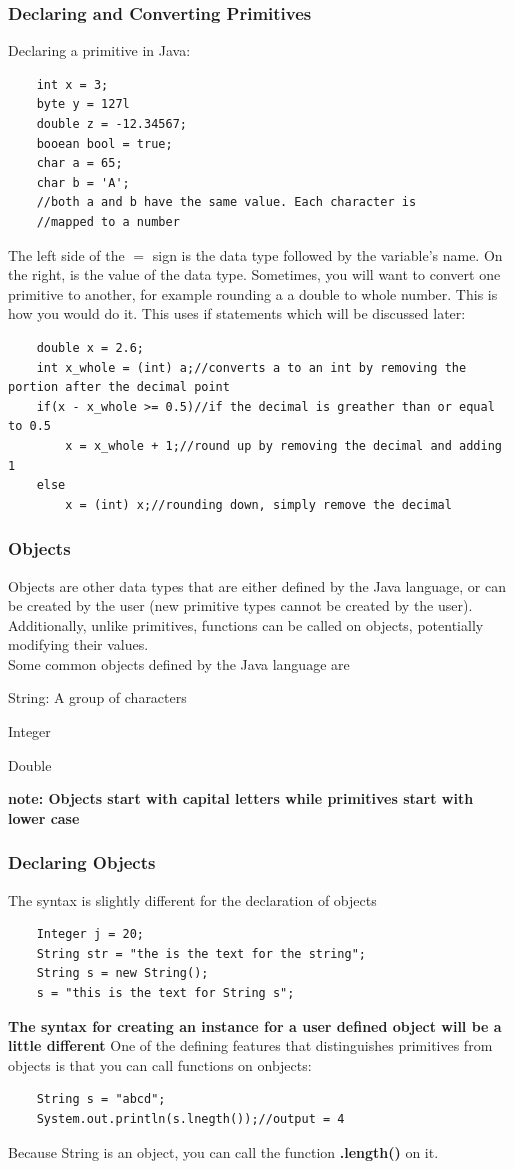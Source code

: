 \documentclass{article}
\begin{document}
\subsubsection{Declaring and Converting Primitives}
Declaring a primitive in Java:
\begin{lstlisting}
	int x = 3;
	byte y = 127l
	double z = -12.34567;
	booean bool = true;
	char a = 65;
	char b = 'A';
	//both a and b have the same value. Each character is
	//mapped to a number 
\end{lstlisting}
The left side of the $=$ sign is the data type followed by the variable's name. On the right, is the value of the data type.
Sometimes, you will want to convert one primitive to another, for example rounding a a double to whole number. This is how you would do it. This uses if statements which will be discussed later:
\begin{lstlisting}
	double x = 2.6;
	int x_whole = (int) a;//converts a to an int by removing the portion after the decimal point
	if(x - x_whole >= 0.5)//if the decimal is greather than or equal to 0.5
		x = x_whole + 1;//round up by removing the decimal and adding 1
	else
		x = (int) x;//rounding down, simply remove the decimal
\end{lstlisting}

\subsubsection{Objects}
Objects are other data types that are either defined by the Java language, or can be created by the user (new primitive types cannot be created by the user). Additionally, unlike primitives, functions can be called on objects, potentially modifying their values.\\
Some common objects defined by the Java language are
\begin{steps}
	\item  String: A group of characters
	\item Integer
	\item Double
\end{steps}
\textbf{note: Objects start with capital letters while primitives start with lower case}
\subsubsection{Declaring Objects}
The syntax is slightly different for the declaration of objects
\begin{lstlisting}
	Integer j = 20;
	String str = "the is the text for the string";
	String s = new String();
	s = "this is the text for String s";
\end{lstlisting}
\textbf{The syntax for creating an instance for a user defined object will be a little different}
One of the defining features that distinguishes primitives from objects is that you can call functions on onbjects:
\begin{lstlisting}
	String s = "abcd";
	System.out.println(s.lnegth());//output = 4
\end{lstlisting}
Because String is an object, you can call the function \textbf{.length()} on it.
\end{document}
